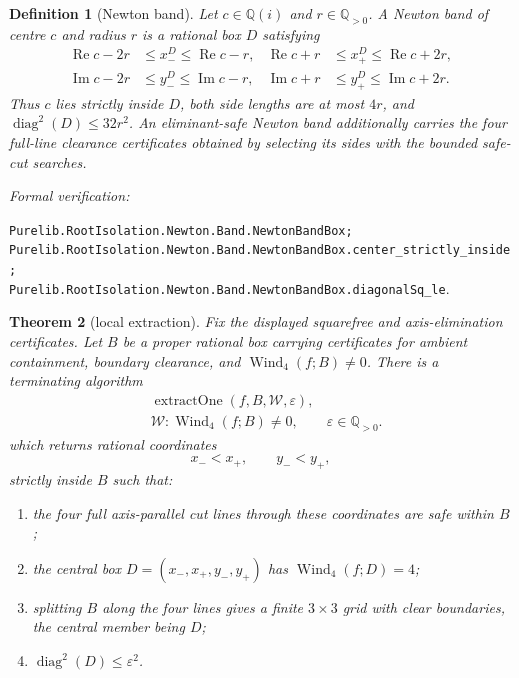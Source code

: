 \documentclass[11pt]{article}
\newtheorem{theorem}{Theorem}[section]
\newtheorem{definition}[theorem]{Definition}
\newcommand{\Qi}{\mathbb{Q}(i)}
\newcommand{\Q}{\mathbb{Q}}
\newcommand{\Ree}{\operatorname{Re}}
\newcommand{\Imm}{\operatorname{Im}}
\newcommand{\Wind}{\operatorname{Wind}}
\newcommand{\diamq}{\operatorname{diag}^{2}}
\newcommand{\eps}{\varepsilon}
\newcommand{\leanref}[1]{\par\smallskip\noindent
  \emph{Formal verification:}\par\nobreak
  {\raggedright\nolinkurl{#1}.\par}}
\begin{document}
\begin{definition}[Newton band]
\label{def:newton-band}
Let $c\in\Qi$ and $r\in\Q_{>0}$.  A \emph{Newton band} of centre $c$ and
radius $r$ is a rational box $D$ satisfying
\[
\begin{aligned}
 \Ree c-2r&\le x_-^D\le\Ree c-r,
 &\Ree c+r&\le x_+^D\le\Ree c+2r,\\
 \Imm c-2r&\le y_-^D\le\Imm c-r,
 &\Imm c+r&\le y_+^D\le\Imm c+2r.
\end{aligned}
\]
Thus $c$ lies strictly inside $D$, both side lengths are at most $4r$, and
$\diamq(D)\le32r^2$.  An \emph{eliminant-safe Newton band} additionally
carries the four full-line clearance certificates obtained by selecting its
sides with the bounded safe-cut searches.
\end{definition}

\leanref{Purelib.RootIsolation.Newton.Band.NewtonBandBox;
Purelib.RootIsolation.Newton.Band.NewtonBandBox.center_strictly_inside;
Purelib.RootIsolation.Newton.Band.NewtonBandBox.diagonalSq_le}

\begin{theorem}[local extraction]
\label{thm:extract-one}
Fix the displayed squarefree and axis-elimination certificates.  Let $B$ be
a proper rational box carrying certificates for ambient containment,
boundary clearance, and $\Wind_4(f;B)\ne0$.  There is a terminating algorithm
\[
 \begin{aligned}
 &\operatorname{extractOne}(f,B,\mathcal W,\eps),\\
 &\mathcal W:\Wind_4(f;B)\ne0,\qquad \eps\in\Q_{>0}.
 \end{aligned}
\]
which returns rational coordinates
\[
       x_-<x_+,
       \qquad y_-<y_+,
\]
strictly inside $B$ such that:
\begin{enumerate}[label=(\alph*)]
\item the four full axis-parallel cut lines through these coordinates are safe within $B$;
\item the central box $D=(x_-,x_+,y_-,y_+)$ has $\Wind_4(f;D)=4$;
\item splitting $B$ along the four lines gives a finite $3\times3$ grid with clear boundaries, the central member being $D$;
\item $\diamq(D)\le\eps^2$.
\end{enumerate}
\end{theorem}
\end{document}

